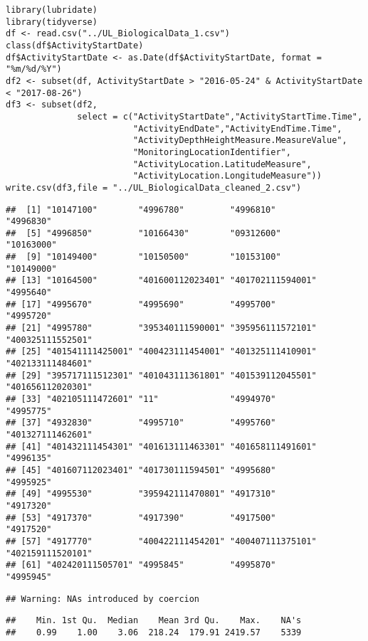 \documentclass[
]{article}
\begin{document}
\begin{verbatim}
library(lubridate)
library(tidyverse)
df <- read.csv("../UL_BiologicalData_1.csv")
class(df$ActivityStartDate)
df$ActivityStartDate <- as.Date(df$ActivityStartDate, format = "%m/%d/%Y")
df2 <- subset(df, ActivityStartDate > "2016-05-24" & ActivityStartDate < "2017-08-26")
df3 <- subset(df2,
              select = c("ActivityStartDate","ActivityStartTime.Time",
                         "ActivityEndDate","ActivityEndTime.Time",
                         "ActivityDepthHeightMeasure.MeasureValue",
                         "MonitoringLocationIdentifier",
                         "ActivityLocation.LatitudeMeasure",
                         "ActivityLocation.LongitudeMeasure"))
write.csv(df3,file = "../UL_BiologicalData_cleaned_2.csv")
\end{verbatim}

\begin{verbatim}
##  [1] "10147100"        "4996780"         "4996810"         "4996830"        
##  [5] "4996850"         "10166430"        "09312600"        "10163000"       
##  [9] "10149400"        "10150500"        "10153100"        "10149000"       
## [13] "10164500"        "401600112023401" "401702111594001" "4995640"        
## [17] "4995670"         "4995690"         "4995700"         "4995720"        
## [21] "4995780"         "395340111590001" "395956111572101" "400325111552501"
## [25] "401541111425001" "400423111454001" "401325111410901" "402133111484601"
## [29] "395717111512301" "401043111361801" "401539112045501" "401656112020301"
## [33] "402105111472601" "11"              "4994970"         "4995775"        
## [37] "4932830"         "4995710"         "4995760"         "401327111462601"
## [41] "401432111454301" "401613111463301" "401658111491601" "4996135"        
## [45] "401607112023401" "401730111594501" "4995680"         "4995925"        
## [49] "4995530"         "395942111470801" "4917310"         "4917320"        
## [53] "4917370"         "4917390"         "4917500"         "4917520"        
## [57] "4917770"         "400422111454201" "400407111375101" "402159111520101"
## [61] "402420111505701" "4995845"         "4995870"         "4995945"
\end{verbatim}

\begin{verbatim}
## Warning: NAs introduced by coercion
\end{verbatim}

\begin{verbatim}
##    Min. 1st Qu.  Median    Mean 3rd Qu.    Max.    NA's 
##    0.99    1.00    3.06  218.24  179.91 2419.57    5339
\end{verbatim}
\end{document}
